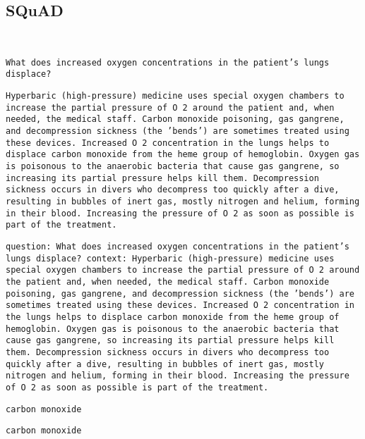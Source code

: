 \documentclass[twoside,11pt]{article}
\begin{document}
\subsection{SQuAD}
\begin{description}[leftmargin=0.5cm]
\item[Original input:] ~
\begin{description}[leftmargin=0.5cm]
  \item[Question:] \texttt{What does increased oxygen concentrations in the patient's lungs displace?}
  \item[Context:] \texttt{Hyperbaric (high-pressure) medicine uses special oxygen chambers to increase the partial pressure of O
2 around the patient and, when needed, the medical staff. Carbon monoxide poisoning, gas gangrene, and decompression sickness (the 'bends') are sometimes treated using these devices. Increased O
2 concentration in the lungs helps to displace carbon monoxide from the heme group of hemoglobin. Oxygen gas is poisonous to the anaerobic bacteria that cause gas gangrene, so increasing its partial pressure helps kill them. Decompression sickness occurs in divers who decompress too quickly after a dive, resulting in bubbles of inert gas, mostly nitrogen and helium, forming in their blood. Increasing the pressure of O
2 as soon as possible is part of the treatment.}
\end{description}
\item[Processed input:] \texttt{question:\ What does increased oxygen concentrations in the patient's lungs displace? context:\ Hyperbaric (high-pressure) medicine uses special oxygen chambers to increase the partial pressure of O
2 around the patient and, when needed, the medical staff. Carbon monoxide poisoning, gas gangrene, and decompression sickness (the 'bends') are sometimes treated using these devices. Increased O
2 concentration in the lungs helps to displace carbon monoxide from the heme group of hemoglobin. Oxygen gas is poisonous to the anaerobic bacteria that cause gas gangrene, so increasing its partial pressure helps kill them. Decompression sickness occurs in divers who decompress too quickly after a dive, resulting in bubbles of inert gas, mostly nitrogen and helium, forming in their blood. Increasing the pressure of O
2 as soon as possible is part of the treatment.}
\item[Original target:] \texttt{carbon monoxide}
\item[Processed target:] \texttt{carbon monoxide}
\end{description}
\end{document}
